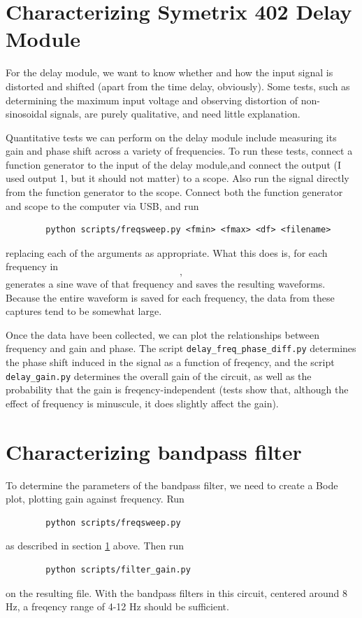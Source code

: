 \documentclass{article}
\newcommand{\code}{\lstinline}
\begin{document}
    \section{Characterizing Symetrix 402 Delay Module}\label{delaymodule}

    For the delay module, we want to know whether and how the input signal is distorted and shifted (apart from the time delay, obviously). Some tests, such as determining the maximum input voltage and observing distortion of non-sinosoidal signals, are purely qualitative, and need little explanation.

    Quantitative tests we can perform on the delay module include measuring its gain and phase shift across a variety of frequencies. To run these tests, connect a function generator to the input of the delay module,and connect the output (I used output 1, but it should not matter) to a scope. Also run the signal directly from the function generator to the scope. Connect both the function generator and scope to the computer via USB, and run
    \begin{lstlisting}
        python scripts/freqsweep.py <fmin> <fmax> <df> <filename>
    \end{lstlisting}
    replacing each of the arguments as appropriate. What this does is, for each frequency in
    \begin{equation*}
        [f_\text{min}, f_\text{min} + df, f_\text{min} + 2df, \dots, f_\text{max}],
    \end{equation*}
    generates a sine wave of that frequency and saves the resulting waveforms. Because the entire waveform is saved for each frequency, the data from these captures tend to be somewhat large.

    Once the data have been collected, we can plot the relationships between frequency and gain and phase. The script \code{delay_freq_phase_diff.py} determines the phase shift induced in the signal as a function of freqency, and the script \code{delay_gain.py} determines the overall gain of the circuit, as well as the probability that the gain is freqency-independent (tests show that, although the effect of frequency is minuscule, it does slightly affect the gain).

    \section{Characterizing bandpass filter}

    To determine the parameters of the bandpass filter, we need to create a Bode plot, plotting gain against frequency. Run
    \begin{lstlisting}
        python scripts/freqsweep.py
    \end{lstlisting}
    as described in section \ref{delaymodule} above. Then run
    \begin{lstlisting}
        python scripts/filter_gain.py
    \end{lstlisting}
    on the resulting file. With the bandpass filters in this circuit, centered around $8$Hz, a freqency range of 4-12 Hz should be sufficient.
\end{document}
